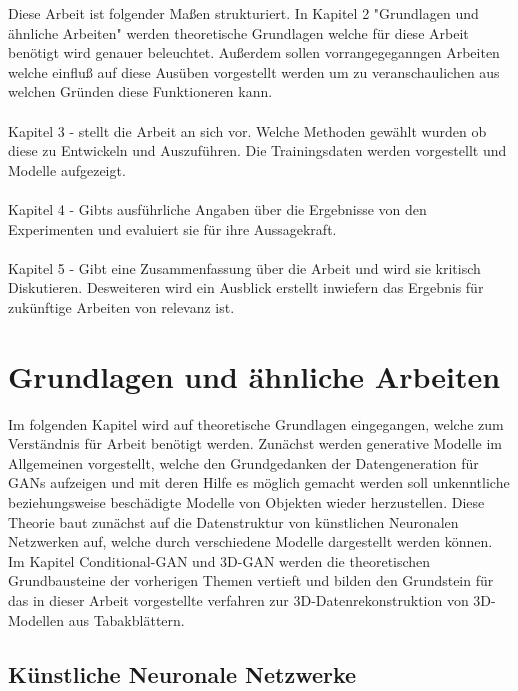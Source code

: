 \documentclass{llncs}
\begin{document}
	Diese Arbeit ist folgender Maßen strukturiert. In Kapitel 2 "Grundlagen und ähnliche Arbeiten" werden theoretische Grundlagen welche für diese Arbeit benötigt wird genauer beleuchtet. Außerdem sollen vorrangegeganngen Arbeiten welche einfluß auf diese Ausüben vorgestellt werden um zu veranschaulichen aus welchen Gründen diese Funktioneren kann.
	\\\\
	Kapitel 3 - stellt die Arbeit an sich vor. Welche Methoden gewählt wurden ob diese zu Entwickeln und Auszuführen. Die Trainingsdaten werden vorgestellt und Modelle aufgezeigt.
	\\\\
	Kapitel 4 - Gibts  ausführliche Angaben über die Ergebnisse von den Experimenten und evaluiert sie für ihre Aussagekraft.
	\\\\
	Kapitel 5 - Gibt eine Zusammenfassung über die Arbeit und wird sie kritisch Diskutieren. Desweiteren wird ein Ausblick erstellt inwiefern das Ergebnis für zukünftige Arbeiten von relevanz ist. 
	
	\section{Grundlagen und ähnliche Arbeiten}
	
	Im folgenden Kapitel wird auf theoretische Grundlagen eingegangen, welche zum Verständnis für Arbeit benötigt werden. Zunächst werden  generative Modelle im Allgemeinen vorgestellt, welche den Grundgedanken der Datengeneration für GANs aufzeigen und mit deren Hilfe es möglich gemacht werden soll unkenntliche beziehungsweise beschädigte Modelle von Objekten wieder herzustellen. Diese Theorie baut zunächst auf die Datenstruktur von künstlichen Neuronalen Netzwerken auf, welche durch verschiedene Modelle dargestellt werden können. Im Kapitel Conditional-GAN und 3D-GAN werden die theoretischen Grundbausteine der vorherigen Themen vertieft und bilden den Grundstein für das in dieser Arbeit vorgestellte verfahren zur 3D-Datenrekonstruktion von 3D-Modellen aus Tabakblättern. 
	
	\subsection{Künstliche Neuronale Netzwerke}
	
\end{document}
